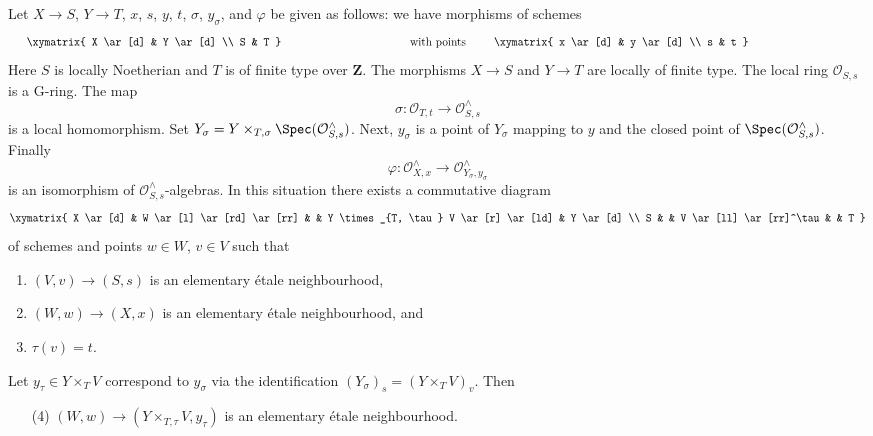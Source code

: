 \begin{lemma}
\label{lemma-relative-map-approximation-pre}
Let $X \to S$, $Y \to T$, $x$, $s$, $y$, $t$, $\sigma$, $y_\sigma$, and
$\varphi$ be given as follows: we have morphisms of schemes
$$
\vcenter{
\xymatrix{
X \ar[d] & Y \ar[d] \\
S & T
}
}
\quad\text{with points}\quad
\vcenter{
\xymatrix{
x \ar[d] & y \ar[d] \\
s & t
}
}
$$
Here $S$ is locally Noetherian and $T$ is of finite type over $\mathbf{Z}$.
The morphisms $X \to S$ and $Y \to T$ are locally of finite type.
The local ring $\mathcal{O}_{S, s}$ is a G-ring. The map
$$
\sigma : \mathcal{O}_{T, t} \longrightarrow \mathcal{O}_{S, s}^\wedge
$$
is a local homomorphism. Set
$Y_\sigma = Y \times_{T, \sigma} \Spec(\mathcal{O}_{S, s}^\wedge)$.
Next, $y_\sigma$ is a point of $Y_\sigma$ mapping to $y$ and
the closed point of $\Spec(\mathcal{O}_{S, s}^\wedge)$. Finally
$$
\varphi :
\mathcal{O}_{X, x}^\wedge
\longrightarrow
\mathcal{O}_{Y_\sigma, y_\sigma}^\wedge
$$
is an isomorphism of $\mathcal{O}_{S, s}^\wedge$-algebras.
In this situation there exists a commutative diagram
$$
\xymatrix{
X \ar[d] &
W \ar[l] \ar[rd] \ar[rr] & &
Y \times_{T, \tau} V \ar[r] \ar[ld] & Y \ar[d] \\
S & &
V \ar[ll] \ar[rr]^\tau & &
T
}
$$
of schemes and points $w \in W$, $v \in V$ such that
\begin{enumerate}
\item $(V, v) \to (S, s)$ is an elementary \'etale neighbourhood,
\item $(W, w) \to (X, x)$ is an elementary \'etale neighbourhood, and
\item $\tau(v) = t$.
\end{enumerate}
Let $y_\tau \in Y \times_T V$ correspond to $y_\sigma$
via the identification $(Y_\sigma)_s = (Y \times_T V)_v$.
Then
\begin{enumerate}
\item[(4)] $(W, w) \to (Y \times_{T, \tau} V, y_\tau)$ is an elementary
\'etale neighbourhood.
\end{enumerate}
\end{lemma}

